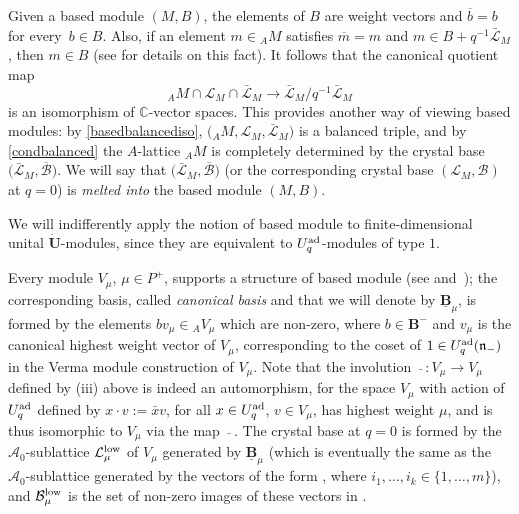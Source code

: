 \documentclass[10pt,a4paper]{amsart}
\numberwithin{equation}{section}
\theoremstyle{definition}
\newcommand{\mc}{\mathbb{C}}
\newcommand{\Ll}{{\mathcal L}}
\newcommand{\ra}{\rightarrow}
\begin{document}
Given a based module $(M,B)$, the elements of $B$ are weight vectors and $\overline{b}=b$ for every~${b\in B}$. Also, if an element $m\in {}_A M$ satisfies $\overline{m}=m$ and $m\in B + q^{-1}\bar{\Ll}_M$, then $m\in B$ (see \cite[Section~27.1.5]{Lusztig} for details on this fact). It follows that the canonical quotient map
\begin{equation}\label{basedbalancediso} {}_A M \cap \Ll_M \cap \bar{\Ll}_M \ra \bar{\Ll}_M/q^{-1}\bar{\Ll}_M
\end{equation}
is an isomorphism of $\mc$-vector spaces. This provides another way of viewing based modules: by \eqref{basedbalancediso}, $\big({}_A M, \Ll_M,\bar{\Ll}_M\big)$ is a balanced triple, and by \eqref{condbalanced} the $A$-lattice ${}_A M$ is completely determined by the crystal base $\big(\bar{\Ll}_M,\overline{\mathcal{B}}\big)$. We will say that $\big(\bar{\Ll}_M,\overline{\mathcal{B}}\big)$ (or the corresponding crystal base $(\Ll_M,\mathcal{B})$ at $q=0$) is {\it melted into} the based module $(M,B)$.

We will indifferently apply the notion of based module to finite-dimensional unital $\dot{\mathbf{U}}$-modules, since they are equivalent to $U_q^{\rm ad}$-modules of type $1$.


Every module $V_\mu$, $\mu\in P^+$, supports a structure of based module (see \cite[Section~14.4.10]{Lusztig} and~\cite{Kashiwara1}); the corresponding basis, called {\it canonical basis} and that we will denote by $\underline{\mathbf{B}}_{\mu}$, is formed by the elements $bv_{\mu}\in {}_AV_\mu$ which are non-zero, where $b\in \mathbf{B}^-$ and $v_{\mu}$ is the canonical highest weight vector of $V_{\mu}$, corresponding to the coset of $1\in U_q^{\rm ad}(\mathfrak{n}_-)$ in the Verma module construction of $V_{\mu}$. Note that the involution $\ \bar{}\ \colon V_{\mu}\ra V_{\mu}$ defined by (iii) above is indeed an automorphism, for the space $V_\mu$ with action of $U_q^{\rm ad}$ defined by $x\cdot v := \bar{x}v$, for all $x\in U_q^{\rm ad}$, $v\in V_\mu$, has highest weight $\mu$, and is thus isomorphic to $V_\mu$ via the map $\ \bar{}\ $. The crystal base \smash{$\big(\Ll_\mu^{\rm low},\mathcal{B}_\mu^{\rm low}\big)$} at $q=0$ is formed by the $\mathcal{A}_0$-sublattice $\Ll_\mu^{\rm low}$ of $V_{\mu}$ generated by $\underline{\mathbf{B}}_{\mu}$ (which is eventually the same as the $\mathcal{A}_0$-sublattice generated by the vectors of the form , where $i_1,\dots ,i_k \in \{1,\dots,m\}$), and $\mathcal{B}_\mu^{\rm low}$ is the set of non-zero images of these vectors in \smash{$\Ll_\mu^{\rm low}/q\Ll_\mu^{\rm low}$}.
\end{document}

